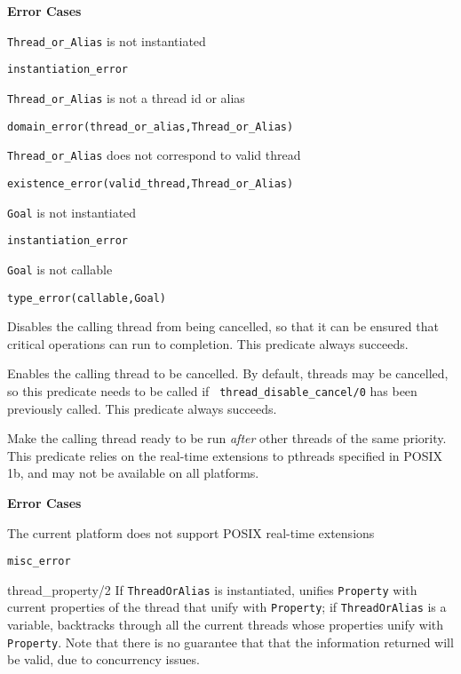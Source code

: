 \begin{description}
{\bf Error Cases}
\bi
\item 	{\tt Thread\_or\_Alias} is not instantiated
\bi
\item 	{\tt instantiation\_error}
\ei
%
\item 	{\tt Thread\_or\_Alias} is not a thread id or alias
\bi
\item 	{\tt domain\_error(thread\_or\_alias,Thread\_or\_Alias)}
\ei
%
\item   {\tt Thread\_or\_Alias} does not correspond to valid thread
\bi
\item   {\tt existence\_error(valid\_thread,Thread\_or\_Alias)}
\ei
\item   {\tt Goal} is not instantiated
\bi
\item 	{\tt instantiation\_error}
\ei
\item   {\tt Goal} is not callable
\bi
\item 	{\tt type\_error(callable,Goal)}
\ei
\ei

% 
Disables the calling thread from being cancelled, so that it can be
ensured that critical operations can run to completion.  This
predicate always succeeds.

% 
Enables the calling thread to be cancelled.  By default, threads may
be cancelled, so this predicate needs to be called if {\tt
  thread\_disable\_cancel/0} has been previously called.  This
predicate always succeeds.

% 
Make the calling thread ready to be run {\em after} other threads of
the same priority.  This predicate relies on the real-time extensions
to pthreads specified in POSIX 1b, and may not be available on all
platforms.

{\bf Error Cases}
\bi
\item 	The current platform does not support POSIX real-time extensions
\bi
\item 	{\tt misc\_error}
\ei
\ei

{thread\_property/2}
%
If {\tt ThreadOrAlias} is instantiated, unifies {\tt Property} with
current properties of the thread that unify with {\tt Property}; if
{\tt ThreadOrAlias} is a variable, backtracks through all the current
threads whose properties unify with {\tt Property}.  Note that there
is no guarantee that that the information returned will be valid, due
to concurrency issues.


\end{description}
